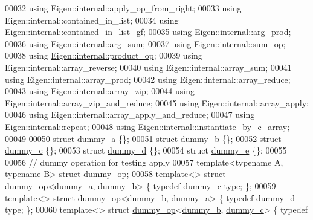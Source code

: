 \begin{DoxyCode}
00032 \textcolor{keyword}{using} Eigen::internal::apply\_op\_from\_right;
00033 \textcolor{keyword}{using} Eigen::internal::contained\_in\_list;
00034 \textcolor{keyword}{using} Eigen::internal::contained\_in\_list\_gf;
00035 \textcolor{keyword}{using} \hyperlink{struct_eigen_1_1internal_1_1arg__prod}{Eigen::internal::arg\_prod};
00036 \textcolor{keyword}{using} Eigen::internal::arg\_sum;
00037 \textcolor{keyword}{using} \hyperlink{struct_eigen_1_1internal_1_1sum__op}{Eigen::internal::sum\_op};
00038 \textcolor{keyword}{using} \hyperlink{struct_eigen_1_1internal_1_1product__op}{Eigen::internal::product\_op};
00039 \textcolor{keyword}{using} Eigen::internal::array\_reverse;
00040 \textcolor{keyword}{using} Eigen::internal::array\_sum;
00041 \textcolor{keyword}{using} Eigen::internal::array\_prod;
00042 \textcolor{keyword}{using} Eigen::internal::array\_reduce;
00043 \textcolor{keyword}{using} Eigen::internal::array\_zip;
00044 \textcolor{keyword}{using} Eigen::internal::array\_zip\_and\_reduce;
00045 \textcolor{keyword}{using} Eigen::internal::array\_apply;
00046 \textcolor{keyword}{using} Eigen::internal::array\_apply\_and\_reduce;
00047 \textcolor{keyword}{using} Eigen::internal::repeat;
00048 \textcolor{keyword}{using} Eigen::internal::instantiate\_by\_c\_array;
00049 
00050 \textcolor{keyword}{struct }\hyperlink{structdummy__a}{dummy\_a} \{\};
00051 \textcolor{keyword}{struct }\hyperlink{structdummy__b}{dummy\_b} \{\};
00052 \textcolor{keyword}{struct }\hyperlink{structdummy__c}{dummy\_c} \{\};
00053 \textcolor{keyword}{struct }\hyperlink{structdummy__d}{dummy\_d} \{\};
00054 \textcolor{keyword}{struct }\hyperlink{structdummy__e}{dummy\_e} \{\};
00055 
00056 \textcolor{comment}{// dummy operation for testing apply}
00057 \textcolor{keyword}{template}<\textcolor{keyword}{typename} A, \textcolor{keyword}{typename} B> \textcolor{keyword}{struct }\hyperlink{structdummy__op}{dummy\_op};
00058 \textcolor{keyword}{template}<> \textcolor{keyword}{struct }\hyperlink{structdummy__op}{dummy\_op}<\hyperlink{structdummy__a}{dummy\_a}, \hyperlink{structdummy__b}{dummy\_b}> \{ \textcolor{keyword}{typedef} 
      \hyperlink{structdummy__c}{dummy\_c} type; \};
00059 \textcolor{keyword}{template}<> \textcolor{keyword}{struct }\hyperlink{structdummy__op}{dummy\_op}<\hyperlink{structdummy__b}{dummy\_b}, \hyperlink{structdummy__a}{dummy\_a}> \{ \textcolor{keyword}{typedef} 
      \hyperlink{structdummy__d}{dummy\_d} type; \};
00060 \textcolor{keyword}{template}<> \textcolor{keyword}{struct }\hyperlink{structdummy__op}{dummy\_op}<\hyperlink{structdummy__b}{dummy\_b}, \hyperlink{structdummy__c}{dummy\_c}> \{ \textcolor{keyword}{typedef} 

\end{DoxyCode}
